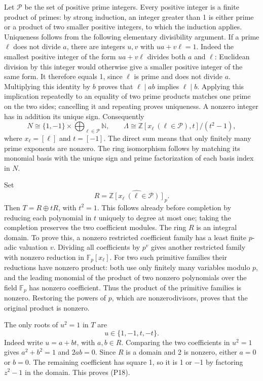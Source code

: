 \documentclass[
]{article}
\begin{document}
Let \(\mathcal P\) be the set of positive prime integers. Every positive
integer is a finite product of primes: by strong induction, an integer
greater than 1 is either prime or a product of two smaller positive
integers, to which the induction applies. Uniqueness follows from the
following elementary divisibility argument. If a prime \(\ell\) does not
divide \(a\), there are integers \(u,v\) with \(ua+v\ell=1\). Indeed the
smallest positive integer of the form \(ua+v\ell\) divides both \(a\)
and \(\ell\): Euclidean division by this integer would otherwise give a
smaller positive integer of the same form. It therefore equals 1, since
\(\ell\) is prime and does not divide \(a\). Multiplying this identity
by \(b\) proves that \(\ell\mid ab\) implies \(\ell\mid b\). Applying
this implication repeatedly to an equality of two prime products matches
one prime on the two sides; cancelling it and repeating proves
uniqueness. A nonzero integer has in addition its unique sign.
Consequently \[
N\cong\{1,-1\}\times\bigoplus_{\ell\in\mathcal P}\mathbb N,
\qquad
\Lambda\cong\mathbb Z[x_\ell\ (\ell\in\mathcal P),t]/(t^2-1),
\tag{P17}
\] where \(x_\ell=[\ell]\) and \(t=[-1]\). The direct sum means that
only finitely many prime exponents are nonzero. The ring isomorphism
follows by matching its monomial basis with the unique sign and prime
factorization of each basis index in \(N\).

Set \[
R=\widehat{\mathbb Z[x_\ell\ (\ell\in\mathcal P)]}_p.
\] Then \(T=R\oplus tR\), with \(t^2=1\). This follows already before
completion by reducing each polynomial in \(t\) uniquely to degree at
most one; taking the completion preserves the two coefficient modules.
The ring \(R\) is an integral domain. To prove this, a nonzero
restricted coefficient family has a least finite \(p\)-adic valuation
\(v\). Dividing all coefficients by \(p^v\) gives another restricted
family with nonzero reduction in \(\mathbb F_p[x_\ell]\). For two such
primitive families their reductions have nonzero product: both use only
finitely many variables modulo \(p\), and the leading monomial of the
product of two nonzero polynomials over the field \(\mathbb F_p\) has
nonzero coefficient. Thus the product of the primitive families is
nonzero. Restoring the powers of \(p\), which are nonzerodivisors,
proves that the original product is nonzero.

The only roots of \(u^2=1\) in \(T\) are \[
u\in\{1,-1,t,-t\}.
\tag{P18}
\] Indeed write \(u=a+bt\), with \(a,b\in R\). Comparing the two
coefficients in \(u^2=1\) gives \(a^2+b^2=1\) and \(2ab=0\). Since \(R\)
is a domain and 2 is nonzero, either \(a=0\) or \(b=0\). The remaining
coefficient has square 1, so it is 1 or −1 by factoring \(z^2-1\) in the
domain. This proves (P18).
\end{document}
